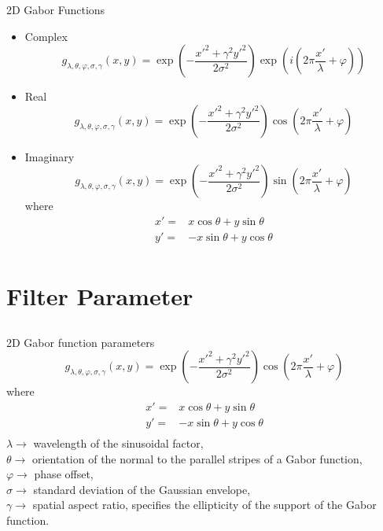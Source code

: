 \begin{frame}{2D Gabor Functions}
\begin{itemize}
\item Complex
\begin{equation}
{g_{\lambda ,\theta ,\varphi ,\sigma ,\gamma }}(x,y) = \exp \left( { - \frac{{x{'^2} + {\gamma ^2}y{'^2}}}{{2{\sigma ^2}}}} \right)\exp \left( i\left({2\pi \frac{{x'}}{\lambda } + \varphi }\right) \right)\nonumber
\end{equation}
\item Real
\begin{equation}
{g_{\lambda ,\theta ,\varphi ,\sigma ,\gamma }}(x,y) = \exp \left( { - \frac{{x{'^2} + {\gamma ^2}y{'^2}}}{{2{\sigma ^2}}}} \right)\cos \left( {2\pi \frac{{x'}}{\lambda } + \varphi } \right)\nonumber
\end{equation}
\item Imaginary
\begin{equation}
{g_{\lambda ,\theta ,\varphi ,\sigma ,\gamma }}(x,y) = \exp \left( { - \frac{{x{'^2} + {\gamma ^2}y{'^2}}}{{2{\sigma ^2}}}} \right)\sin \left( {2\pi \frac{{x'}}{\lambda } + \varphi } \right)\nonumber
\end{equation}
where
\begin{align*}
x'=&x\cos \theta +y\sin \theta\\
y'=&-x\sin \theta +y\cos \theta\\
\end{align*}
\end{itemize}
\end{frame}
\section{Filter Parameter}
\subsection{}
\begin{frame}{2D Gabor function parameters}
\begin{equation}
{g_{\lambda ,\theta ,\varphi ,\sigma ,\gamma }}(x,y) = \exp \left( { - \frac{{x{'^2} + {\gamma ^2}y{'^2}}}{{2{\sigma ^2}}}} \right)\cos \left( {2\pi \frac{{x'}}{\lambda } + \varphi } \right)\nonumber
\end{equation}
where
\begin{align*}
x'=&x\cos \theta +y\sin \theta\\
y'=&-x\sin \theta +y\cos \theta\\
\end{align*}
$\lambda\rightarrow$ wavelength of the sinusoidal factor,\\
$\theta\rightarrow$ orientation of the normal to the parallel stripes of a Gabor function,\\
$\varphi\rightarrow$ phase offset,\\
$\sigma\rightarrow$ standard deviation of the Gaussian envelope,\\
$\gamma\rightarrow$ spatial aspect ratio, specifies the ellipticity of the support of the Gabor function.
\end{frame}

